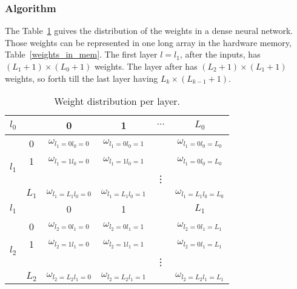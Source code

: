 \documentclass[final, paper=letter,5p,times,twocolumn]{elsarticle}
\begin{document}
\subsubsection{Algorithm}

The Table~\ref{weights_distribution} guives the distribution of the weights in a dense neural network. Those weights can be represented in one long array in the hardware memory, Table~\ref{weights_in_mem}. The first layer $l = l_{1}$, after the inputs, has $(L_{1}+1)\times(L_{0}+1)$ weights. The layer after has $(L_{2}+1)\times(L_{1}+1)$ weights, so forth till the last layer having $L_{k}\times(L_{k-1}+1)$.

\begin{table}[]
\centering
\caption{Weight distribution per layer.}
\label{weights_distribution}
\begin{tabular}{|c|c|c|c|c|c|}
\hline
$l_{0}$                   && 0                                   & 1                        & $\cdots$ & $L_{0}$ \\ \hline
\multirow{4}{*}{$l_{1}$}  &0& $\omega_{l_{1}=0l_{0}=0}$              & $\omega_{l_{1}=0l_{0}=1}$    &        & $\omega_{l_{1}=0l_{0}=L_{0}}$ \\ \cline{2-6} 
                         &1& $\omega_{l_{1}=1l_{0}=0}$              & $\omega_{l_{1}=1l_{0}=1}$    &        & $\omega_{l_{1}=0l_{0}=L_{0}}$ \\ \cline{2-6} 
                         &&                                     &                          & \vdots & \\ \cline{2-6} 
                         &$L_{1}$& $\omega_{l_{1}=L_{1}l_{0}=0}$      & $\omega_{l_{1}=L_{1}l_{0}=1}$ &        & $\omega_{l_{1}=L_{1}l_{0}=L_{0}}$ \\ \hline
$l_{1}$                   && 0                                   & 1                       &        & $L_{1}$ \\ \hline
\multirow{4}{*}{$l_{2}$}  &0& $\omega_{l_{2}=0l_{1}=0}$              &  $\omega_{l_{2}=0l_{1}=1}$   &        &  $\omega_{l_{2}=0l_{1}=L_{1}}$ \\ \cline{2-6} 
                         &1& $\omega_{l_{2}=1l_{1}=0}$              &  $\omega_{l_{2}=1l_{1}=1}$   &        &   $\omega_{l_{2}=0l_{1}=L_{1}}$ \\ \cline{2-6} 
                         &&                                     &                          & \vdots & \\ \cline{2-6} 
                         &$L_{2}$&$\omega_{l_{2}=L_{2}l_{1}=0}$       & $\omega_{l_{2}=L_{2}l_{1}=1}$ &        & $\omega_{l_{2}=L_{2}l_{1}=L_{1}}$ \\ \hline

\end{tabular}
\end{table}
\end{document}

